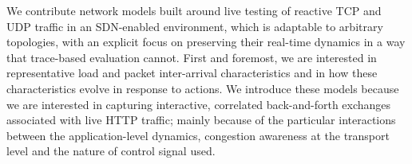 \documentclass[10pt, times, comsoc]{IEEEtran}
\begin{document}
We contribute network models built around live testing of reactive TCP and UDP traffic in an SDN-enabled environment, which is adaptable to arbitrary topologies, with an explicit focus on preserving their real-time dynamics in a way that trace-based evaluation cannot.
First and foremost, we are interested in representative load and packet inter-arrival characteristics and in how these characteristics evolve in response to actions.
We introduce these models because we are interested in capturing interactive, correlated back-and-forth exchanges associated with live HTTP traffic; mainly because of the particular interactions between the application-level dynamics, congestion awareness at the transport level and the nature of control signal used.



\end{document}
